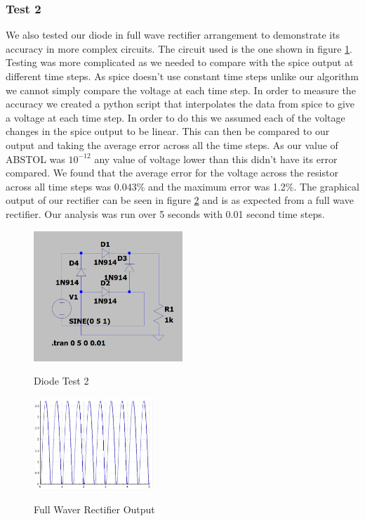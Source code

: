 \documentclass{article}
\begin{document}
\subsubsection{Test 2}
We also tested our diode in full wave rectifier arrangement to demonstrate its accuracy in more complex circuits. The circuit used is the one shown in figure \ref{fig:DiodeTest2}. Testing was more complicated as we needed to compare with the spice output at different time steps. As spice doesn't use constant time steps unlike our algorithm we cannot simply compare the voltage at each time step. In order to measure the accuracy we created a python script that interpolates the data from spice to give a voltage at each time step. In order to do this we assumed each of the voltage changes in the spice output to be linear. This can then be compared to our output and taking the average error across all the time steps. As our value of ABSTOL was $10^{-12}$ any value of voltage lower than this didn't have its error compared. We found that the average error for the voltage across the resistor across all time steps was 0.043\% and the maximum error was 1.2\%. The graphical output of our rectifier can be seen in figure \ref{fig:FullWaveRec} and is as expected from a full wave rectifier. Our analysis was run over 5 seconds with 0.01 second time steps. 
\begin{figure}[h]
    \caption{Diode Test 2}
    \centering
    \includegraphics[width=0.5\textwidth]{images/DiodeTest2.png}
    \label{fig:DiodeTest2}
\end{figure}
\begin{figure}[h]
    \caption{Full Waver Rectifier Output}
    \centering
    \includegraphics[width=0.4\textwidth]{images/FullWaveRec.png}
    \label{fig:FullWaveRec}
\end{figure}
\newpage
\end{document}
